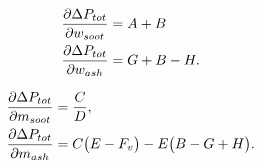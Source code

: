 \begin{align}
    \frac{\partial \Delta P_{tot}}{\partial w_{soot}} &= A+B\\
    \frac{\partial \Delta P_{tot}}{\partial w_{ash}} &= G+B-H.
\end{align}


\begin{align}
        \frac{\partial \Delta P_{tot}}{\partial m_{soot}} &=\frac{C}{D},
        \\
        \frac{\partial \Delta P_{tot}}{\partial m_{ash}} &=C\bigl(E - F_v\bigr)-E\bigl(B - G + H\bigr).
\end{align}

